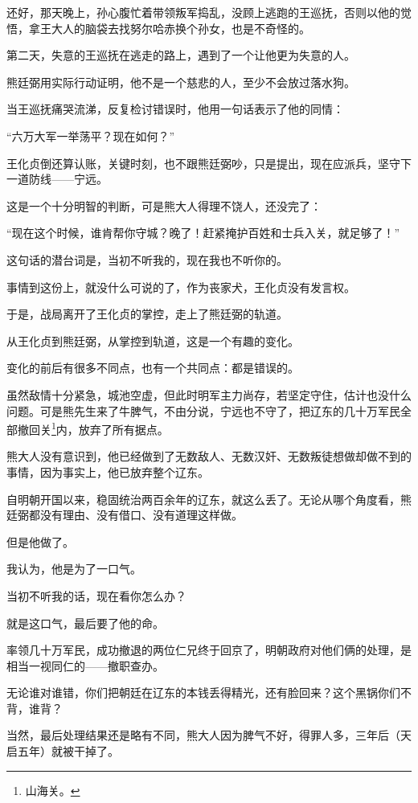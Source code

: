 \begin{multicols}{\theparacolNo}
		还好，那天晚上，孙心腹忙着带领叛军捣乱，没顾上逃跑的王巡抚，否则以他的觉悟，拿王大人的脑袋去找努尔哈赤换个孙女，也是不奇怪的。

		第二天，失意的王巡抚在逃走的路上，遇到了一个让他更为失意的人。

		熊廷弼用实际行动证明，他不是一个慈悲的人，至少不会放过落水狗。

		当王巡抚痛哭流涕，反复检讨错误时，他用一句话表示了他的同情：

		“六万大军一举荡平？现在如何？”

		王化贞倒还算认账，关键时刻，也不跟熊廷弼吵，只是提出，现在应派兵，坚守下一道防线——宁远。

		这是一个十分明智的判断，可是熊大人得理不饶人，还没完了：

		“现在这个时候，谁肯帮你守城？晚了！赶紧掩护百姓和士兵入关，就足够了！”

		这句话的潜台词是，当初不听我的，现在我也不听你的。

		事情到这份上，就没什么可说的了，作为丧家犬，王化贞没有发言权。

		于是，战局离开了王化贞的掌控，走上了熊廷弼的轨道。

		从王化贞到熊廷弼，从掌控到轨道，这是一个有趣的变化。

		变化的前后有很多不同点，也有一个共同点：都是错误的。

		虽然敌情十分紧急，城池空虚，但此时明军主力尚存，若坚定守住，估计也没什么问题。可是熊先生来了牛脾气，不由分说，宁远也不守了，把辽东的几十万军民全部撤回关\footnote{山海关。}内，放弃了所有据点。

		熊大人没有意识到，他已经做到了无数敌人、无数汉奸、无数叛徒想做却做不到的事情，因为事实上，他已放弃整个辽东。

		自明朝开国以来，稳固统治两百余年的辽东，就这么丢了。无论从哪个角度看，熊廷弼都没有理由、没有借口、没有道理这样做。

		但是他做了。

		我认为，他是为了一口气。

		当初不听我的话，现在看你怎么办？

		就是这口气，最后要了他的命。

		率领几十万军民，成功撤退的两位仁兄终于回京了，明朝政府对他们俩的处理，是相当一视同仁的——撤职查办。

		无论谁对谁错，你们把朝廷在辽东的本钱丢得精光，还有脸回来？这个黑锅你们不背，谁背？

		当然，最后处理结果还是略有不同，熊大人因为脾气不好，得罪人多，三年后（天启五年）就被干掉了。


\end{multicols}
